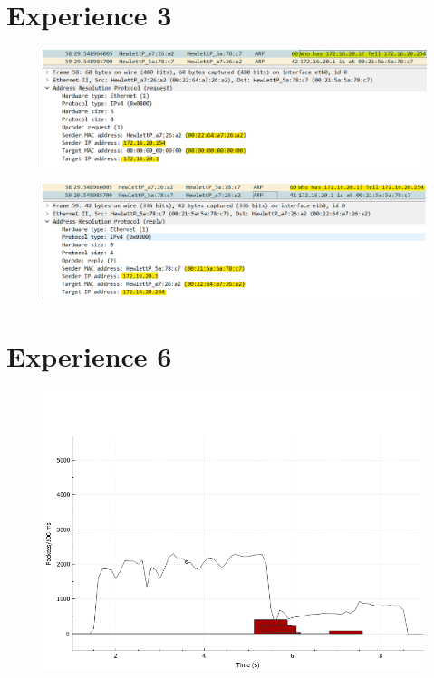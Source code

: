 \documentclass[11pt]{report}
\begin{document}
\clearpage

\section{Experience 3}

\begin{figure}[h!]
    \centering
    \includegraphics[width=\textwidth]{images/Experience3_1.png}
    \caption{}
    \label{fig:experience3_1}
\end{figure}

\begin{figure}[h!]
    \centering
    \includegraphics[width=\textwidth]{images/Experience3_2.png}
    \caption{}
    \label{fig:experience3_2}
\end{figure}

\clearpage

\section{Experience 6}

\begin{figure}[h!]
    \centering
    \includegraphics[width=\textwidth]{images/Experience6_1.png}
    \caption{}
    \label{fig:experience6_1}
\end{figure}
\end{document}

